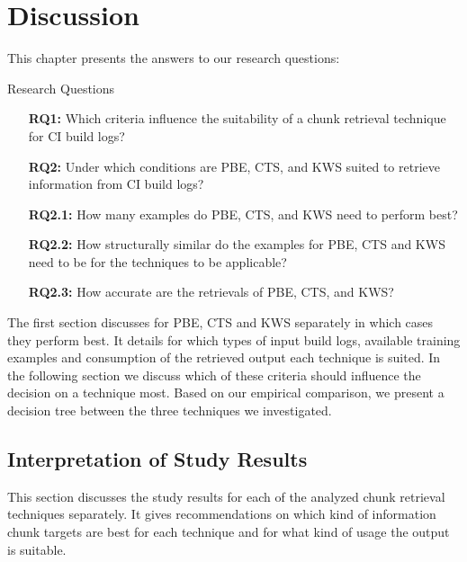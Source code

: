 \documentclass[\myrootdir/main.tex]{subfiles}
\begin{document}
\chapter{Discussion}
\label{sec:discussion}

This chapter presents the answers to our research questions:
\begin{simplebox}{Research Questions}
\begin{itemize}
  \item[\textbf{RQ1:}] Which criteria influence the suitability of a chunk retrieval technique for CI build logs?
  \item[\textbf{RQ2:}] Under which conditions are PBE, CTS, and KWS suited to retrieve information from CI build logs?
  \item[\textbf{RQ2.1:}] How many examples do PBE, CTS, and KWS need to perform best?
  \item[\textbf{RQ2.2:}] How structurally similar do the examples for PBE, CTS and KWS need to be for the techniques to be applicable?
  \item[\textbf{RQ2.3:}] How accurate are the retrievals of PBE, CTS, and KWS?
\end{itemize}
\end{simplebox}

The first section discusses for PBE, CTS and KWS separately in which cases they perform best.
It details for which types of input build logs, available training examples and consumption of the retrieved output each technique is suited.
In the following section we discuss which of these criteria should influence the decision on a technique most.
Based on our empirical comparison, we present a decision tree between the three techniques we investigated.

\section{Interpretation of Study Results}
This section discusses the study results for each of the analyzed chunk retrieval techniques separately.
It gives recommendations on which kind of information chunk targets are best for each technique and for what kind of usage the output is suitable.
\end{document}
